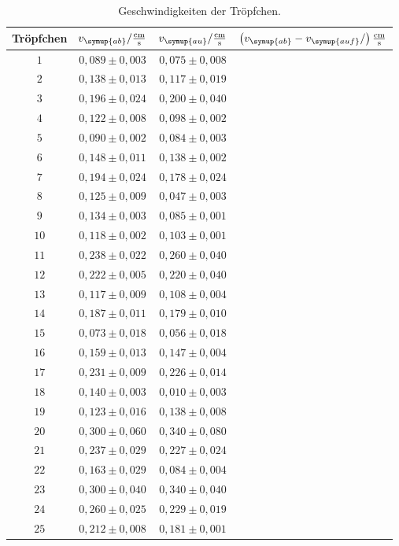 \begin{table}
  \centering
  \caption{Geschwindigkeiten der Tröpfchen.}
  \label{tab:Geschwindigkeit}
  \begin{tabular}{c | c c c}
    \toprule
    Tröpfchen & $v_{\symup{ab}}/\frac{\si{\centi\meter}}{\si{\second}}$ & $v_{\symup{au}}/\frac{\si{\centi\meter}}{\si{\second}}$ &
    $\left(v_{\symup{ab}} - v_{\symup{auf}}/\right)\frac{\si{\centi\meter}}{\si{\second}}$ \\
    \midrule
    $  1 $ & $ 0,089 \pm 0,003 $ & $ 0,075 \pm 0,008 $ & \\
    $  2 $ & $ 0,138 \pm 0,013 $ & $ 0,117 \pm 0,019 $ & \\
    $  3 $ & $ 0,196 \pm 0,024 $ & $ 0,200 \pm 0,040 $ & \\
    $  4 $ & $ 0,122 \pm 0,008 $ & $ 0,098 \pm 0,002 $ & \\
    $  5 $ & $ 0,090 \pm 0,002 $ & $ 0,084 \pm 0,003 $ & \\
    $  6 $ & $ 0,148 \pm 0,011 $ & $ 0,138 \pm 0,002 $ & \\
    $  7 $ & $ 0,194 \pm 0,024 $ & $ 0,178 \pm 0,024 $ & \\
    $  8 $ & $ 0,125 \pm 0,009 $ & $ 0,047 \pm 0,003 $ & \\
    $  9 $ & $ 0,134 \pm 0,003 $ & $ 0,085 \pm 0,001 $ & \\
    $ 10 $ & $ 0,118 \pm 0,002 $ & $ 0,103 \pm 0,001 $ & \\
    $ 11 $ & $ 0,238 \pm 0,022 $ & $ 0,260 \pm 0,040 $ & \\
    $ 12 $ & $ 0,222 \pm 0,005 $ & $ 0,220 \pm 0,040 $ & \\
    $ 13 $ & $ 0,117 \pm 0,009 $ & $ 0,108 \pm 0,004 $ & \\
    $ 14 $ & $ 0,187 \pm 0,011 $ & $ 0,179 \pm 0,010 $ & \\
    $ 15 $ & $ 0,073 \pm 0,018 $ & $ 0,056 \pm 0,018 $ & \\
    $ 16 $ & $ 0,159 \pm 0,013 $ & $ 0,147 \pm 0,004 $ & \\
    $ 17 $ & $ 0,231 \pm 0,009 $ & $ 0,226 \pm 0,014 $ & \\
    $ 18 $ & $ 0,140 \pm 0,003 $ & $ 0,010 \pm 0,003 $ & \\
    $ 19 $ & $ 0,123 \pm 0,016 $ & $ 0,138 \pm 0,008 $ & \\
    $ 20 $ & $ 0,300 \pm 0,060 $ & $ 0,340 \pm 0,080 $ & \\
    $ 21 $ & $ 0,237 \pm 0,029 $ & $ 0,227 \pm 0,024 $ & \\
    $ 22 $ & $ 0,163 \pm 0,029 $ & $ 0,084 \pm 0,004 $ & \\
    $ 23 $ & $ 0,300 \pm 0,040 $ & $ 0,340 \pm 0,040 $ & \\
    $ 24 $ & $ 0,260 \pm 0,025 $ & $ 0,229 \pm 0,019 $ & \\
    $ 25 $ & $ 0,212 \pm 0,008 $ & $ 0,181 \pm 0,001 $ & \\
    \bottomrule
  \end{tabular}
\end{table}


